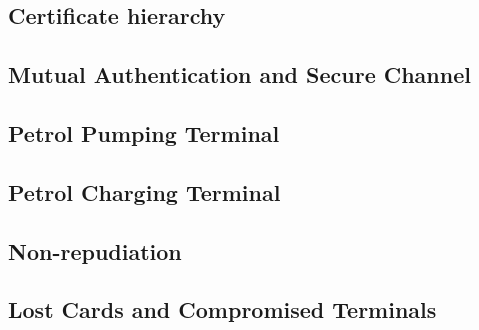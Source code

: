 \documentclass[a4paper,10pt]{llncs}
\begin{document}
\subsection{Certificate hierarchy}


\subsection{Mutual Authentication and Secure Channel}
\label{section:mutualauth}


\subsection{Petrol Pumping Terminal}


\subsection{Petrol Charging Terminal}
\label{subsection:chargingterminal}


\subsection{Non-repudiation}
\label{subsection:nonrepud}


\subsection{Lost Cards and Compromised Terminals}
\label{section:lost}

\end{document}
